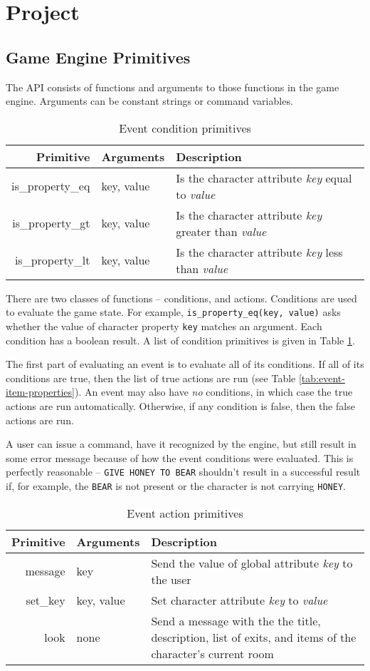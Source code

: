 \documentclass{article}
\newcommand{\enterProblemHeader}[1]{
}
\newcommand{\exitProblemHeader}[1]{
\nobreak\extramarks{#1}{}\nobreak
}
\newcounter{homeworkProblemCounter} %
\newcommand{\homeworkProblemName}{}
\newenvironment{homeworkProblem}[1][Problem \arabic{homeworkProblemCounter}]{ %
\stepcounter{homeworkProblemCounter} %
\renewcommand{\homeworkProblemName}{#1} %
\section{\homeworkProblemName} %
\enterProblemHeader{\homeworkProblemName} %
}{
\exitProblemHeader{\homeworkProblemName} %
}
\newcommand{\homeworkSectionName}{}
\newenvironment{homeworkSection}[1]{ %
\renewcommand{\homeworkSectionName}{#1} %
\subsection{\homeworkSectionName} %
\enterProblemHeader{\homeworkProblemName\ [\homeworkSectionName]} %
}{
\enterProblemHeader{\homeworkProblemName} %
}
\begin{document}
\begin{homeworkProblem}[Project]
\begin{homeworkSection}{Game Engine Primitives}
	The API consists of functions and arguments to those functions in the game engine. Arguments can be constant strings or command variables.

	\begin{table}
		\begin{tabularx}{\textwidth}{|r|l|X|}
			\hline
			Primitive & Arguments & Description \\
			\hline \hline
			is\_property\_eq & key, value & Is the character attribute \textit{key} equal to \textit{value} \\
			is\_property\_gt & key, value & Is the character attribute \textit{key} greater than \textit{value} \\
			is\_property\_lt & key, value & Is the character attribute \textit{key} less than \textit{value} \\
			\hline
		\end{tabularx}
		\caption{Event condition primitives}
		\label{tab:event-condition-primitives}
	\end{table}

	There are two classes of functions -- conditions, and actions. Conditions are used to evaluate the game state. For example, \texttt{is\_property\_eq(key, value)} asks whether the value of character property \texttt{key} matches an argument. Each condition has a boolean result. A list of condition primitives is given in Table \ref{tab:event-condition-primitives}.
	
	The first part of evaluating an event is to evaluate all of its conditions. If all of its conditions are true, then the list of true actions are run (see Table \ref{tab:event-item-properties}). An event may also have \textit{no} conditions, in which case the true actions are run automatically. Otherwise, if any condition is false, then the false actions are run.

	A user can issue a command, have it recognized by the engine, but still result in some error message because of how the event conditions were evaluated. This is perfectly reasonable -- \texttt{GIVE HONEY TO BEAR} shouldn't result in a successful result if, for example, the \texttt{BEAR} is not present or the character is not carrying \texttt{HONEY}.

	\begin{table}
		\begin{tabularx}{\textwidth}{|r|l|X|}
			\hline
			Primitive & Arguments & Description \\
			\hline \hline
			message     & key        & Send the value of global attribute \textit{key} to the user \\
			set\_key    & key, value & Set character attribute \textit{key} to \textit{value} \\
			look        & none       & Send a message with the the title, description, list of exits, and items of the character's current room \\
			\hline
		\end{tabularx}
		\caption{Event action primitives}
		\label{tab:event-action-primitives}
	\end{table}


\end{homeworkSection}
\end{homeworkProblem}
\end{document}
